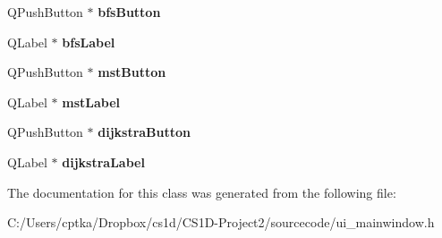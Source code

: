 \begin{DoxyCompactItemize}
Q\+Push\+Button $\ast$ {\bfseries bfs\+Button}
\item 
\mbox{\label{class_ui___main_window_a4e2cc128245809c0939ad1034d0a2822}} 
Q\+Label $\ast$ {\bfseries bfs\+Label}
\item 
\mbox{\label{class_ui___main_window_a23f3039069193b857e88e6903d874159}} 
Q\+Push\+Button $\ast$ {\bfseries mst\+Button}
\item 
\mbox{\label{class_ui___main_window_a4c2a97c4fbcc86c0a4f1e913cea986b4}} 
Q\+Label $\ast$ {\bfseries mst\+Label}
\item 
\mbox{\label{class_ui___main_window_aa55906b0d1013ad8c23e3c66a3435dde}} 
Q\+Push\+Button $\ast$ {\bfseries dijkstra\+Button}
\item 
\mbox{\label{class_ui___main_window_a9f7a84a5cb2bc0a76527a6285deee29c}} 
Q\+Label $\ast$ {\bfseries dijkstra\+Label}
\end{DoxyCompactItemize}


The documentation for this class was generated from the following file\+:\begin{DoxyCompactItemize}
\item 
C\+:/\+Users/cptka/\+Dropbox/cs1d/\+C\+S1\+D-\/\+Project2/sourcecode/ui\+\_\+mainwindow.\+h\end{DoxyCompactItemize}

